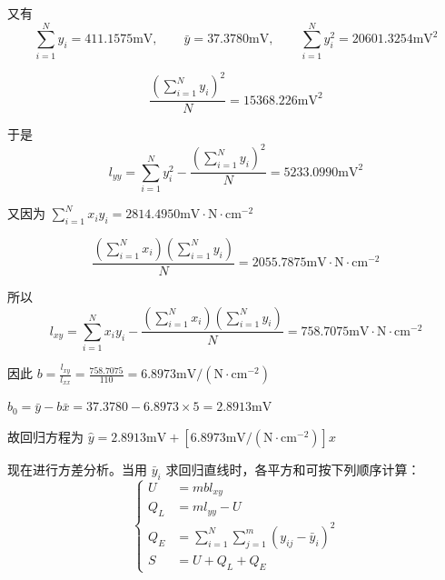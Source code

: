 \documentclass[UTF8,zihao=-4]{ctexart}
\begin{document}
又有
\begin{equation*}
    \sum_{i=1}^{N}y_i=411.1575\mathrm{mV}, \qquad \bar{y}=37.3780\mathrm{mV}, \qquad \sum_{i=1}^{N}y_i^2=20601.3254\mathrm{mV}^2
\end{equation*}

\begin{equation*}
    \frac{\left(\displaystyle\sum_{i=1}^{N}y_i\right)^2}{N} = 15368.226\mathrm{mV}^2
\end{equation*}

于是
\begin{equation*}
    l_{yy} = \sum_{i=1}^{N}y_i^2 - \frac{\left(\displaystyle\sum_{i=1}^{N}y_i\right)^2}{N} = 5233.0990\mathrm{mV}^2
\end{equation*}

又因为 $\sum_{i=1}^{N}x_i y_i=2814.4950\mathrm{mV}\cdot\mathrm{N}\cdot\mathrm{cm}^{-2}$

\begin{equation*}
    \frac{\left(\displaystyle\sum_{i=1}^{N}x_i\right) \left(\displaystyle\sum_{i=1}^{N}y_i\right)}{N} = 2055.7875\mathrm{mV}\cdot\mathrm{N}\cdot\mathrm{cm}^{-2}
\end{equation*}

所以
\begin{equation*}
    l_{xy} = \sum_{i=1}^{N}x_i y_i - \frac{\left(\displaystyle\sum_{i=1}^{N}x_i\right) \left(\displaystyle\sum_{i=1}^{N}y_i\right)}{N} = 758.7075\mathrm{mV}\cdot\mathrm{N}\cdot\mathrm{cm}^{-2}
\end{equation*}

因此 $b = \frac{l_{xy}}{l_{xx}} = \frac{758.7075}{110} = 6.8973\mathrm{mV}/(\mathrm{N}\cdot\mathrm{cm}^{-2})$

$b_0 = \bar{y}-b\bar{x} = 37.3780-6.8973\times5 = 2.8913\mathrm{mV}$

故回归方程为 $\hat{y} = 2.8913\mathrm{mV} + \left[ 6.8973\mathrm{mV}/(\mathrm{N}\cdot\mathrm{cm}^{-2}) \right]x$

现在进行方差分析。当用 $\bar{y}_i$ 求回归直线时，各平方和可按下列顺序计算：
\begin{equation*}
\left\{
\begin{aligned}
    U&=mbl_{xy}\\
    Q_L&=ml_{yy}-U\\
    Q_E&=\sum_{i=1}^{N}\sum_{j=1}^{m}(y_{ij}-\bar{y}_i)^2\\
    S&=U+Q_L+Q_E
\end{aligned}
\right.
\end{equation*}
\end{document}
